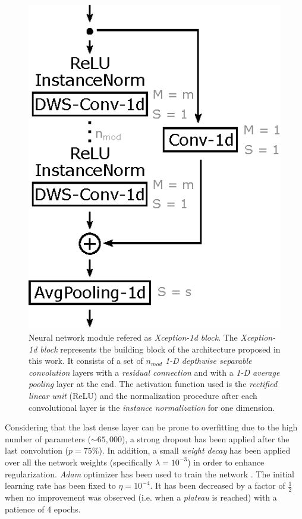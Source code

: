\documentclass[review]{elsarticle}
\begin{document}
\begin{figure}[ht]
	\centering
	\includegraphics[width=0.4\linewidth]{img/xception_module.eps}
	\caption{Neural network module refered as \textit{Xception-1d block}. The \textit{Xception-1d block} represents the building block of the architecture proposed in this work. It consists of a set of $n_{mod}$ \textit{1-D depthwise separable convolution} layers with a \textit{residual connection} and with a \textit{1-D average pooling} layer at the end. The activation function used is the \textit{rectified linear unit} (ReLU) and the normalization procedure after each convolutional layer is the \textit{instance normalization} for one dimension.}
	\label{fig:xceptionmodule}
\end{figure}



Considering that the last dense layer can be prone to overfitting due to the high number of parameters ($\sim 65,000$), a strong dropout \cite{Srivastava2014, Goodfellow2016} has been applied after the last convolution ($p = 75\%$). In addition, a small \textit{weight decay} \cite{Krogh1991, Haykin1998, Goodfellow2016} has been applied over all the network weights (specifically $\lambda = 10^{-3}$) in order to enhance regularization. \textit{Adam} optimizer has been used to train the network \cite{Kingma14}. The initial learning rate has been fixed to $\eta = 10^{-4}$. It has been decreased by a factor of $\frac{1}{2}$ when no improvement was observed (i.e. when a \textit{plateau} is reached) with a patience of 4 epochs.
\end{document}
